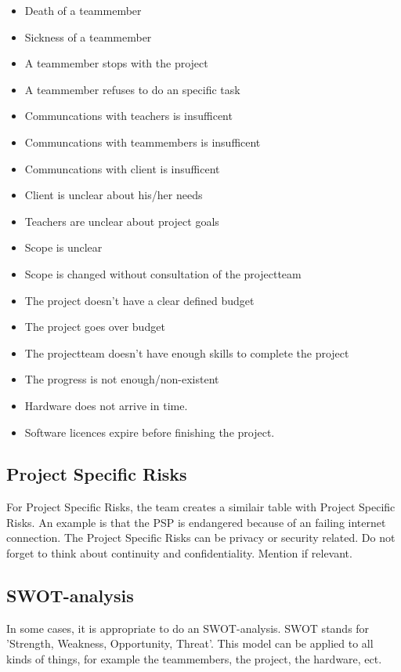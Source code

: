 \documentclass[10pt]{report}
\begin{document}
\begin{itemize}
	\item Death of a teammember
	\item Sickness of a teammember
	\item A teammember stops with the project
	\item A teammember refuses to do an specific task
	\item Communcations with teachers is insufficent
	\item Communcations with teammembers is insufficent
	\item Communcations with client is insufficent
	\item Client is unclear about his/her needs
	\item Teachers are unclear about project goals
	\item Scope is unclear
	\item Scope is changed without consultation of the projectteam
	\item The project doesn't have a clear defined budget
	\item The project goes over budget
	\item The projectteam doesn't have enough skills to complete the project
	\item The progress is not enough/non-existent
	\item Hardware does not arrive in time.
	\item Software licences expire before finishing the project.
\end{itemize}

\subsection{Project Specific Risks}

For Project Specific Risks, the team creates a similair table with Project Specific Risks. An example is that the PSP is endangered because of an failing internet connection. The Project Specific Risks can be privacy or security related. Do not forget to think about continuity and confidentiality. Mention if relevant.

\subsection{SWOT-analysis}

In some cases, it is appropriate to do an SWOT-analysis. SWOT stands for 'Strength, Weakness, Opportunity, Threat'. This model can be applied to all kinds of things, for example the teammembers, the project, the hardware, ect. 
\end{document}
